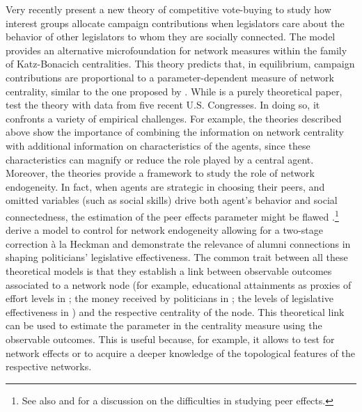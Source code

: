 \documentclass[nojss]{jss}
\begin{document}
Very recently \cite{Battaglini+Patacchini:2018} present a new theory of competitive vote-buying to study how interest groups allocate campaign contributions when legislators care about the behavior of other legislators to whom they are socially connected. The model provides an alternative microfoundation for network measures within the family of Katz-Bonacich centralities. This theory predicts that, in equilibrium, campaign contributions are proportional to a parameter-dependent measure of network centrality, similar to the one proposed by \cite{Ballester+Armengol+Zenou:2006}. While \cite{Ballester+Armengol+Zenou:2006} is a purely theoretical paper, \cite{Battaglini+Patacchini:2018} test the theory with data from five recent U.S. Congresses. In doing so, it confronts a variety of empirical challenges. For example, the theories described above show the importance of combining the information on network centrality with additional information on characteristics of the agents, since these characteristics can magnify or reduce the role played by a central agent. Moreover, the theories provide a framework to study the role of network endogeneity. In fact, when agents are strategic in choosing their peers, and omitted variables (such as social skills) drive both agent's behavior and social connectedness, the estimation of the peer effects parameter might be flawed \citep{Manski:1993}.\footnote{See also \cite{An:2015a} and \cite{VanderWeele+An:2013} for a discussion on the difficulties in studying peer effects.} \cite{Battaglini+Sciabolazza+Patacchini:2020} derive a model to control for network endogeneity allowing for a two-stage correction \`{a} la Heckman \citep{Heckman:1979} and demonstrate the relevance of alumni connections in shaping politicians' legislative effectiveness.
The common trait between all these theoretical models is that they establish a link between observable outcomes associated to a network node (for example, educational attainments as proxies of effort levels in \cite{Ballester+Armengol+Zenou:2006}; the money received by politicians in \cite{Battaglini+Patacchini:2018}; the levels of legislative effectiveness in \cite{Battaglini+Sciabolazza+Patacchini:2020}) and the respective centrality of the node. This theoretical link can be used to estimate the parameter in the centrality measure using the observable outcomes. This is useful because, for example, it allows to test for network effects or to acquire a deeper knowledge of the topological features of the respective networks.
\end{document}
